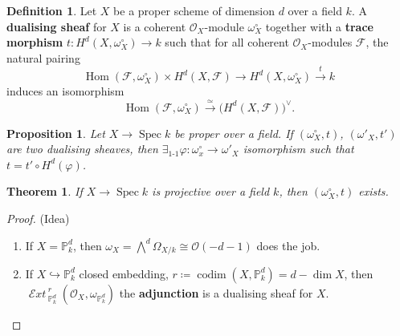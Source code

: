 \documentclass[12pt]{article}
\DeclareMathOperator{\Hom}{Hom}
\DeclareMathOperator{\Spec}{Spec}
\DeclareMathOperator{\codim}{codim}
\DeclareMathOperator{\shExt}{\mathcal{E}\textit{xt}\,}
\newtheorem*{proposition}{Proposition}
\newtheorem*{theorem}{Theorem}
\theoremstyle{definition}
\newtheorem*{definition}{Definition}
\begin{document}
\begin{definition}
Let $X$ be a proper scheme of dimension $d$ over a field $k$. A \textbf{dualising sheaf} for $X$ is a coherent $\mathcal{O}_X$-module $\omega_X^{\circ}$ together with a \textbf{trace morphism} $t:H^d(X,\omega_X^{\circ})\rightarrow k$ such that for all coherent $\mathcal{O}_X$-modules $\mathcal{F}$, the natural pairing
\[\Hom(\mathcal{F},\omega_X^{\circ})\times H^d(X,\mathcal{F})\longrightarrow H^d(X,\omega_X^{\circ})\overset{t}{\longrightarrow}k\]
induces an isomorphism
\[\Hom(\mathcal{F},\omega_X^{\circ})\overset{\simeq}{\longrightarrow}\big(H^d(X,\mathcal{F})\big)^{\vee}.\]
\end{definition}

\begin{proposition}
Let $X\rightarrow\Spec k$ be proper over a field. If $(\omega_X^{\circ},t)$, $(\omega'_X,t')$ are two dualising sheaves, then $\exists_{1\text{-}1}\varphi:\omega_x^{\circ}\rightarrow\omega'_X$ isomorphism such that $t=t'\circ H^d(\varphi)$.
\end{proposition}

\begin{theorem}
If $X\rightarrow\Spec k$ is projective over a field $k$, then $(\omega_X^{\circ},t)$ exists.
\end{theorem}

\begin{proof}
(Idea)
\begin{enumerate}[label=\arabic*)]
\item If $X=\mathbb{P}_k^d$, then $\omega_X=\bigwedge^d\Omega_{X/k}\cong\mathcal{O}(-d-1)$ does the job.

\item If $X\hookrightarrow\mathbb{P}_k^d$ closed embedding, $r\coloneqq\codim(X,\mathbb{P}_k^d)=d-\dim X$, then $\shExt_{\mathbb{P}_k^d}^r(\mathcal{O}_X,\omega_{\mathbb{P}_k^d})$ the \textbf{adjunction} is a dualising sheaf for $X$.
\end{enumerate}
\end{proof}
\end{document}
